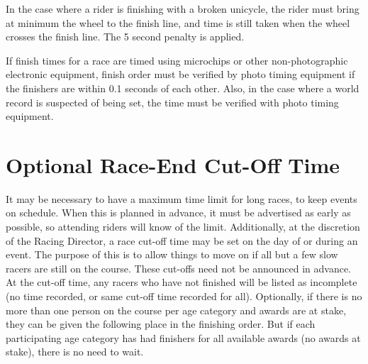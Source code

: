 In the case where a rider is finishing with a broken unicycle, the rider must bring at minimum the wheel to the finish line, and time is still taken when the wheel crosses the finish line.
The 5 second penalty is applied.

If finish times for a race are timed using microchips or other non-photographic electronic equipment, finish order must be verified by photo timing equipment if the finishers are within 0.1 seconds of each other.
Also, in the case where a world record is suspected of being set, the time must be verified with photo timing equipment.

\section{Optional Race-End Cut-Off Time}
It may be necessary to have a maximum time limit for long races, to keep events on schedule.
When this is planned in advance, it must be advertised as early as possible, so attending riders will know of the limit.
Additionally, at the discretion of the Racing Director, a race cut-off time may be set on the day of or during an event.
The purpose of this is to allow things to move on if all but a few slow racers are still on the course.
These cut-offs need not be announced in advance.
At the cut-off time, any racers who have not finished will be listed as incomplete (no time recorded, or same cut-off time recorded for all).
Optionally, if there is no more than one person on the course per age category and awards are at stake, they can be given the following place in the finishing order.
But if each participating age category has had finishers for all available awards (no awards at stake), there is no need to wait.



